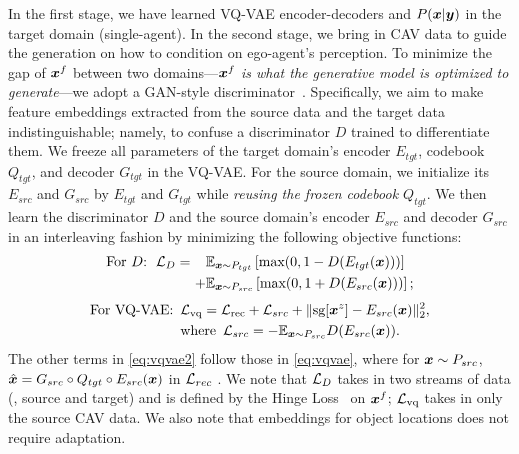 In the first stage, we have learned VQ-VAE encoder-decoders and $P({\bm{x}}|{\bm{y}})$ in the target domain (single-agent). 
In the second stage, we bring in CAV data to guide the generation on how to condition on ego-agent's perception. 
To minimize the gap of ${\bm{x}}^f$ between two domains---\emph{${\bm{x}}^f$ is what the generative model is optimized to generate}---we adopt a GAN-style discriminator~\citep{lim2017geometric,goodfellow2014generative,ganin2016domain,tzeng2017adversarial}. 
Specifically, we aim to make feature embeddings extracted from the source data and the target data indistinguishable; namely, to confuse a discriminator $D$ trained to differentiate them.
We freeze all parameters of the target domain's encoder $E_{tgt}$, codebook $Q_{tgt}$, and decoder $G_{tgt}$ in the VQ-VAE. For the source domain, we initialize its $E_{src}$ and $G_{src}$ by $E_{tgt}$ and $G_{tgt}$ while \emph{reusing the frozen codebook $Q_{tgt}$}. We then learn the discriminator $D$ and the source domain's encoder $E_{src}$ and decoder $G_{src}$ in an interleaving fashion by minimizing the following objective functions: 
\begin{equation}
\begin{split}  \text{For $D$: \hspace{2pt}}\mathcal{L}_D=\hspace{11pt}&{\mathbb{E}}_{{\bm{x}} \sim P_{tgt}}\left[\text{max}(0, 1 - D(E_{tgt}({\bm{x}})))\right] \\
    + &{\mathbb{E}}_{{\bm{x}} \sim P_{src}}\left[\text{max}(0, 1 
 + D(E_{src}({\bm{x}})))\right];
\end{split}
\label{eq:hinge}
\end{equation}
\begin{align}
\text{For VQ-VAE:\hspace{5pt}} & \mathcal{L}_{\text{vq}} = \mathcal{L}_{\text{rec}} + \mathcal{L}_{src} + \lVert\text{sg}[{\bm{x}}^z] - E_{src}({\bm{x}})\rVert^2_2,
\label{eq:vqvae2}\\
& \text{where\hspace{5pt}} \mathcal{L}_{src} = - {\mathbb{E}}_{{\bm{x}} \sim P_{src}}D(E_{src}({\bm{x}})).
\end{align}
The other terms in \cref{eq:vqvae2} follow those in \cref{eq:vqvae}, where for ${\bm{x}} \sim P_{src}$, $\hat{{\bm{x}}}=G_{src} \circ Q_{tgt} \circ E_{src}({\bm{x}})$ in $\mathcal{L}_{rec}$ . 
We note that $\mathcal{L}_D$ takes in two streams of data (\ie, source and target) and is defined by the Hinge Loss~\citep{lim2017geometric} on ${\bm{x}}^f$; $\mathcal{L}_{\text{vq}}$ takes in only the source CAV data. We also note that embeddings for object locations does not require adaptation. 

